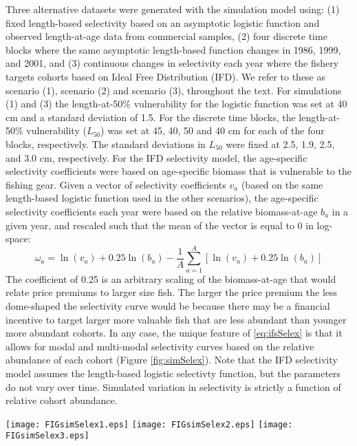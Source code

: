 \documentclass[review,letterpaper,10pt,authoryear]{elsarticle}
\begin{document}
Three alternative datasets were generated with the simulation model using: (1) fixed length-based selectivity based on an asymptotic logistic function and observed length-at-age data from commercial samples, (2) four discrete time blocks where the same asymptotic length-based function changes in 1986, 1999, and 2001, and (3) continuous changes in selectivity each year where the fishery targets cohorts based on Ideal Free Distribution (IFD).  We refer to these as scenario (1), scenario (2) and scenario (3), throughout the text.  For simulations (1) and (3) the length-at-50\% vulnerability for the logistic function was set at 40 cm and a standard deviation of 1.5.  For the discrete time blocks, the length-at-50\% vulnerability ($L_{50}$) was set at 45, 40, 50 and 40 cm for each of the four blocks, respectively.  The standard deviations in $L_{50}$ were fixed at 2.5, 1.9, 2.5, and 3.0 cm, respectively.  For the IFD selectivity model, the age-specific selectivity coefficients were based on age-specific biomass that is vulnerable to the fishing gear.  Given a vector of selectivity coefficients $v_a$ (based on the same length-based logistic function used in the other scenarios), the age-specific selectivity coefficients each year were based on the relative biomass-at-age $b_a$ in a given year, and rescaled such that the mean of the vector is equal to 0 in log-space:
\begin{equation}\label{eq:ifsSelex}
	\omega_a = \ln(v_a) + 0.25\ln(b_a) - 
	\frac{1}{A}\sum_{a=1}^A \left[ \ln(v_a) + 0.25\ln(b_a)\right]
\end{equation}
The coefficient of 0.25 is an arbitrary scaling of the biomass-at-age that would relate price premiums to larger size fish.  The larger the price premium the less dome-shaped the selectivity curve would be because there may be a financial incentive to target larger more valuable fish that are less abundant than younger more abundant cohorts.  In any case, the unique feature of \eqref{eq:ifsSelex} is that it allows for modal and multi-modal selectivity curves based on the relative abundance of each cohort (Figure \ref{fig:simSelex}).  Note that the IFD selectivity model assumes the length-based logistic selectivty function, but the parameters do not vary over time.  Simulated variation in selectivity is strictly a function of relative cohort abundance.

\begin{figure*}[!tbh]
	\begin{center}
		\texttt{[image: FIGsimSelex1.eps]}
		\hspace{-1.25cm}
		\texttt{[image: FIGsimSelex2.eps]}
		\hspace{-1.25cm}
		\texttt{[image: FIGsimSelex3.eps]}
	\end{center}
	\caption{True selectivity curves used to generate simulated data sets for scenario 1 (left), scenario 2 (middle), scenario 3 (right).}
	\label{fig:simSelex}
\end{figure*}
\end{document}
